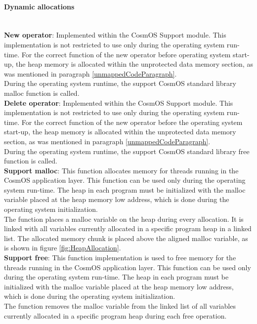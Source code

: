 \paragraph{Dynamic allocations}\mbox{}\\
\indent \textbf{New operator}: Implemented within the CosmOS Support module. This implementation is not restricted to use only during the operating system run-time. For the correct function of the new operator before operating system start-up, the heap memory is allocated within the unprotected data memory section, as was mentioned in paragraph \ref{unmappedCodeParagraph}.\\
\indent During the operating system runtime, the support CosmOS standard library malloc function is called.\\

\textbf{Delete operator}: Implemented within the CosmOS Support module. This implementation is not restricted to use only during the operating system run-time. For the correct function of the new operator before the operating system start-up, the heap memory is allocated within the unprotected data memory section, as was mentioned in paragraph \ref{unmappedCodeParagraph}.\\
\indent During the operating system runtime, the support CosmOS standard library free function is called.\\

\textbf{Support malloc}: This function allocates memory for threads running in the CosmOS application layer. This function can be used only during the operating system run-time. The heap in each program must be initialized with the malloc variable placed at the heap memory low address, which is done during the operating system initialization.\\
\indent The function places a malloc variable on the heap during every allocation. It is linked with all variables currently allocated in a specific program heap in a linked list. The allocated memory chunk is placed above the aligned malloc variable, as is shown in figure \ref{fig:HeapAllocation}.\\

\textbf{Support free}: This function implementation is used to free memory for the threads running in the CosmOS application layer. This function can be used only during the operating system run-time. The heap in each program must be initialized with the malloc variable placed at the heap memory low address, which is done during the operating system initialization.\\
\indent The function removes the malloc variable from the linked list of all variables currently allocated in a specific program heap during each free operation.

